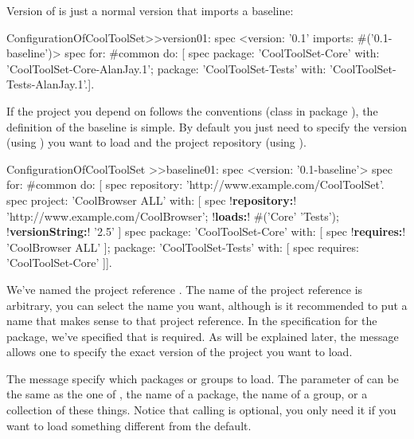 \documentclass[a4paper,10pt,twoside]{book}
\begin{document}
Version  of  is just a normal version that imports a baseline:
\begin{code}{}
ConfigurationOfCoolToolSet>>version01: spec
       <version: '0.1' imports: #('0.1-baseline')>
       spec for: #common do: [
              spec
                     package: 'CoolToolSet-Core' with: 'CoolToolSet-Core-AlanJay.1';
                     package: 'CoolToolSet-Tests' with: 'CoolToolSet-Tests-AlanJay.1'.].
\end{code}

\noindent
If the project you depend on follows the  conventions (\ie class  in package ), the definition of the baseline is simple. By default you just need to specify the version (using ) you want to load and the project repository (using ).

\begin{code}{}
ConfigurationOfCoolToolSet >>baseline01: spec
       <version: '0.1-baseline'>
       spec for: #common do: [
              spec repository: 'http://www.example.com/CoolToolSet'.
              spec project: 'CoolBrowser ALL' with: [
                            spec
                                 !\textbf{repository:}! 'http://www.example.com/CoolBrowser';
                                 !\textbf{loads:}! #('Core' 'Tests');
                                 !\textbf{versionString:}! '2.5' ]
              spec
                     package: 'CoolToolSet-Core' with: [ spec !\textbf{requires:}! 'CoolBrowser ALL' ];
                     package: 'CoolToolSet-Tests' with: [ spec requires: 'CoolToolSet-Core' ]].
\end{code}

We've named the project reference . The name of the project reference is arbitrary, you can select the name you want, although is it recommended to put a name that makes sense to that project reference.  In the specification for the  package, we've specified that  is required. As will be explained later, the message  allows one to specify the exact version of the project you want to load.

The message  specify which packages or groups to load. The
parameter of  can be the same as the one of , \ie
the name of a package, the name of a group, or a collection of these
things. Notice that calling  is optional, you only need it
if you want to load something different from the default.
\end{document}
